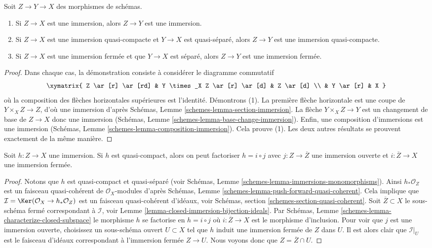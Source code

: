 \begin{lemma}
\label{lemma-immersion-permanence}
Soit $Z \to Y \to X$ des morphismes de schémas.
\begin{enumerate}
\item Si $Z \to X$ est une immersion, alors $Z \to Y$ est une immersion.
\item Si $Z \to X$ est une immersion quasi-compacte et $Y \to X$ est
quasi-séparé, alors $Z \to Y$ est une immersion quasi-compacte.
\item Si $Z \to X$ est une immersion fermée et que $Y \to X$ est séparé, alors
$Z \to Y$ est une immersion fermée.
\end{enumerate}
\end{lemma}

\begin{proof}
Dans chaque cas, la démonstration consiste à considérer le diagramme commutatif
$$
\xymatrix{
Z \ar[r] \ar[rd] & Y \times_X Z \ar[r] \ar[d] & Z \ar[d] \\
& Y \ar[r] & X
}
$$
où la composition des flèches horizontales supérieures est
l’identité. Démontrons (1). La première flèche horizontale
est une coupe de $Y \times_X Z \to Z$, d'où
une immersion d'après Schémas, Lemme \ref{schemes-lemma-section-immersion}.
La flèche $Y \times_X Z \to Y$ est un changement de base de $Z \to X$
donc une immersion (Schémas, Lemme \ref{schemes-lemma-base-change-immersion}). Enfin,
une composition d'immersions est une immersion
(Schémas, Lemme \ref{schemes-lemma-composition-immersion}). Cela prouve (1). Les deux autres résultats
se prouvent exactement de la même manière.
\end{proof}

\begin{lemma}
\label{lemma-factor-quasi-compact-immersion}
Soit $h : Z \to X$ une immersion. Si
$h$ est quasi-compact, alors on
peut factoriser $h = i \circ j$ avec $j : Z \to \overline{Z}$
une immersion ouverte et $i : \overline{Z} \to X$ une immersion fermée.
\end{lemma}

\begin{proof}
Notons que $h$ est quasi-compact
et quasi-séparé (voir Schémas, Lemme \ref{schemes-lemma-immersions-monomorphisms}).
Ainsi $h_*\mathcal{O}_Z$ est un faisceau quasi-cohérent
de $\mathcal{O}_X$-modules d'après Schémas, Lemme
\ref{schemes-lemma-push-forward-quasi-coherent}.
Cela implique que $\mathcal{I} = \Ker(\mathcal{O}_X \to h_*\mathcal{O}_Z)$ est un
faisceau quasi-cohérent d'idéaux,
voir Schémas, section \ref{schemes-section-quasi-coherent}.
Soit $\overline{Z} \subset X$ le sous-schéma fermé correspondant
à $\mathcal{I}$, voir Lemme \ref{lemma-closed-immersion-bijection-ideals}. Par Schémas,
Lemme \ref{schemes-lemma-characterize-closed-subspace} le morphisme $h$
se factorise en
$h = i \circ j$ où $i : \overline{Z} \to X$ est le morphisme d'inclusion. Pour voir que $j$
est une immersion ouverte, choisissez un sous-schéma ouvert
$U \subset X$ tel que $h$ induit une immersion fermée de
$Z$ dans $U$. Il est alors clair que $\mathcal{I}|_U$
est le faisceau d'idéaux correspondant à l'immersion fermée
$Z \to U$. Nous voyons donc que $Z = \overline{Z} \cap U$.
\end{proof}

